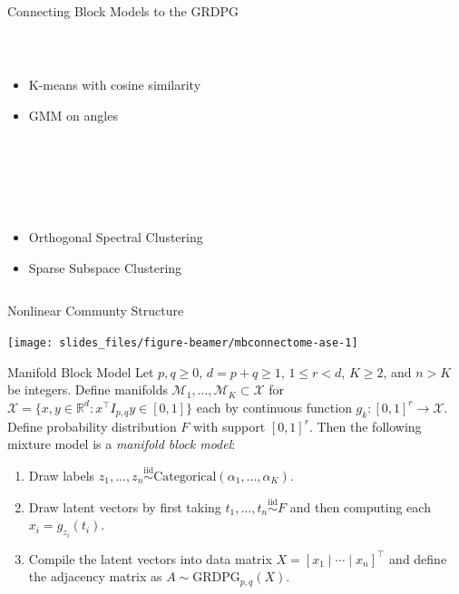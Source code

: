 \documentclass[
  ignorenonframetext,
]{beamer}
\providecommand{\tightlist}{%
  \setlength{\itemsep}{0pt}\setlength{\parskip}{0pt}}
\begin{document}
\begin{frame}{Connecting Block Models to the GRDPG}
\begin{columns}[T]
\begin{column}{0.33\textwidth}
~

\begin{itemize}
\tightlist
\item
  K-means with cosine similarity
\item
  GMM on angles
\end{itemize}

~

~

~

\begin{itemize}
\tightlist
\item
  Orthogonal Spectral Clustering
\item
  Sparse Subspace Clustering
\end{itemize}
\end{column}
\end{columns}
\end{frame}

\begin{frame}{Nonlinear Communty Structure}
\protect\hypertarget{nonlinear-communty-structure}{}
\begin{center}\texttt{[image: slides\_files/figure-beamer/mbconnectome-ase-1]} \end{center}
\end{frame}

\begin{frame}{Manifold Block Model}
\protect\hypertarget{manifold-block-model}{}
Let \(p, q \geq 0\), \(d = p + q \geq 1\), \(1 \leq r < d\),
\(K \geq 2\), and \(n > K\) be integers. Define manifolds
\(\mathcal{M}_1, ..., \mathcal{M}_K \subset \mathcal{X}\) for
\(\mathcal{X} = \{x, y \in \mathbb{R}^d : x^\top I_{p,q} y \in [0, 1]\}\)
each by continuous function \(g_k : [0, 1]^r \to \mathcal{X}\). Define
probability distribution \(F\) with support \([0, 1]^r\). Then the
following mixture model is a \emph{manifold block model}:

\begin{enumerate}
\item Draw labels $z_1, ..., z_n \stackrel{\text{iid}}{\sim}\text{Categorical}(\alpha_1, ..., \alpha_K)$.
\item Draw latent vectors by first taking $t_1,..., t_n \stackrel{\text{iid}}{\sim}F$ and then computing each $x_i = g_{z_i}(t_i)$. 
\item Compile the latent vectors into data matrix $X = [ x_1 \mid \cdots \mid x_n ]^\top$ and define the adjacency matrix as $A \sim \text{GRDPG}_{p,q}(X)$. 
\end{enumerate}
\end{frame}
\end{document}
